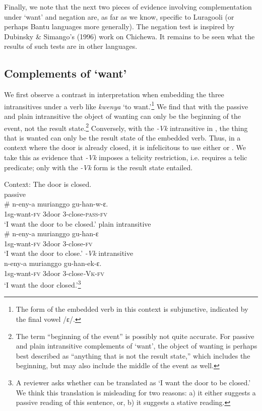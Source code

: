 \documentclass[output=paper]{langsci/lanmgscibook}
\begin{document}
Finally, we note that the next two pieces of evidence involving complementation under ‘want’ and negation are, as far as we know, specific to Luragooli (or perhaps Bantu languages more generally). The negation test is inspired by Dubinsky \& Simango’s (1996) work on Chichewa. It remains to be seen what the results of such tests are in other languages. 

\subsection{Complements of ‘want’}

We first observe a contrast in interpretation when embedding the three intransitives under a verb like \textit{kwenya} ‘to want.’\footnote{The form of the embedded verb in this context is subjunctive, indicated by the final vowel /ɛ/.} We find that with the passive  and plain intransitive  the object of wanting can only be the beginning of the event, not the result state.\footnote{The term “beginning of the event” is possibly not quite accurate. For passive and plain intransitive complements of ‘want’, the object of wanting is perhaps best described as “anything that is not the result state,” which includes the beginning, but may also include the middle of the event as well.}  Conversely, with the \textit{-Vk} intransitive in , the thing that is wanted can only be the result state of the embedded verb. Thus, in a context where the door is already closed, it is infelicitous to use either  or . We take this as evidence that \textit{-Vk} imposes a telicity restriction, i.e. requires a telic predicate; only with the \textit{-Vk} form is the result state entailed.

\ea\label{ex:gluckman:12} 
{Context: The door is closed.}\\
  \ea\label{ex:gluckman:12a}
  {{passive}}\\
  \gll   \# n-eny-a       murianggo gu-han-w-ɛ.\\
      {}  1sg-want-\textsc{fv} 3door         3-close-\textsc{pass}-\textsc{fv}\\
  \glt ‘I want the door to be closed.’
  \ex\label{ex:gluckman:12b}
  {  {plain intransitive}}\\
  \gll   \# n-eny-a       murianggo gu-han-ɛ\\
      {}  1sg-want-\textsc{fv} 3door        3-close-\textsc{fv}\\
  \glt ‘I want the door to close.’
  \ex\label{ex:gluckman:12c}
  {{\textit{-Vk}} {intransitive}}\\
  \gll   n-eny-a         murianggo gu-han-ek-ɛ.\\
	1sg-want-\textsc{fv} 3door        3-close\textit{-}\textsc{Vk}-\textsc{fv}\\
  \glt ‘I want the door closed.’\footnote{A reviewer asks whether  can be translated as ‘I want the door to be closed.’ We think this translation is misleading for two reasons: a) it either suggests a passive reading of this sentence, or, b) it suggests a stative reading.}
  \z
\z
\end{document}
